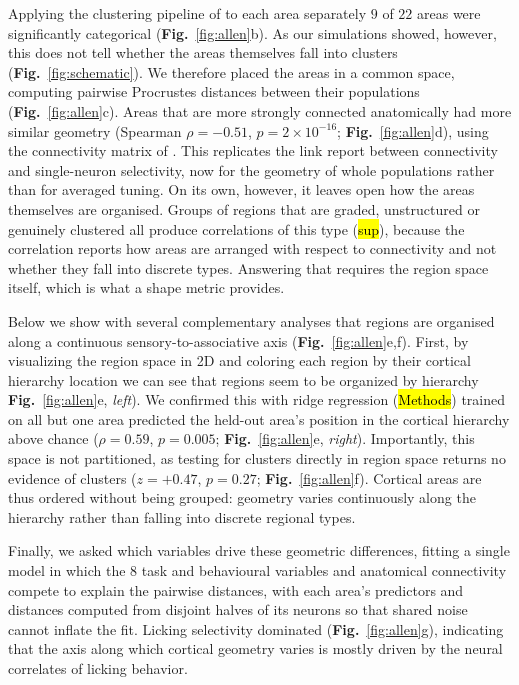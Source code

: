 Applying the clustering pipeline of \textcite{posani2026} to each area separately $9$
of $22$ areas were significantly categorical (\textbf{Fig.}~\ref{fig:allen}b).
As our simulations showed, however, this does not tell whether the areas
themselves fall into clusters
(\textbf{Fig.}~\ref{fig:schematic}). We therefore placed the areas in a common space, computing pairwise Procrustes
distances between their populations (\textbf{Fig.}~\ref{fig:allen}c). Areas that
are more strongly connected anatomically had more similar geometry (Spearman
$\rho = -0.51$, $p = 2\times10^{-16}$; \textbf{Fig.}~\ref{fig:allen}d), 
using the connectivity matrix of \textcite{harris2019}. This replicates the link \textcite{posani2026} report between connectivity and single-neuron selectivity, now for the geometry of whole populations rather than for averaged tuning. On its own, however, it leaves open how the areas themselves are organised. Groups of regions that are graded, unstructured or genuinely clustered all produce correlations of this type (\hl{sup}), because the correlation reports how areas are arranged with respect to connectivity and not whether they fall into discrete types. Answering that requires the region space itself, which is what a shape metric provides.

Below we show with several complementary analyses that regions are organised
along a continuous sensory-to-associative axis (\textbf{Fig.}~\ref{fig:allen}e,f). First, by visualizing the region space in 2D and coloring each region by their cortical hierarchy location we can see that regions seem to be organized by hierarchy \textbf{Fig.}~\ref{fig:allen}e, \textit{left}).  We confirmed this with ridge
regression (\hl{Methods}) trained on all but one area predicted the held-out area's position in
the cortical hierarchy above chance ($\rho = 0.59$, $p = 0.005$;
\textbf{Fig.}~\ref{fig:allen}e, \textit{right}). Importantly, this space is not
partitioned, as testing for clusters directly in region space returns no evidence of clusters
($z = +0.47$, $p = 0.27$; \textbf{Fig.}~\ref{fig:allen}f). Cortical areas are thus
ordered without being grouped: geometry varies continuously along the hierarchy
rather than falling into discrete regional types.

Finally, we asked which variables drive these geometric differences, fitting a
single model in which the $8$ task and behavioural variables and anatomical
connectivity compete to explain the pairwise distances, with each area's
predictors and distances computed from disjoint halves of its neurons so that
shared noise cannot inflate the fit. Licking selectivity dominated
(\textbf{Fig.}~\ref{fig:allen}g), indicating that the axis along which cortical
geometry varies is mostly driven by the neural correlates of licking behavior.


